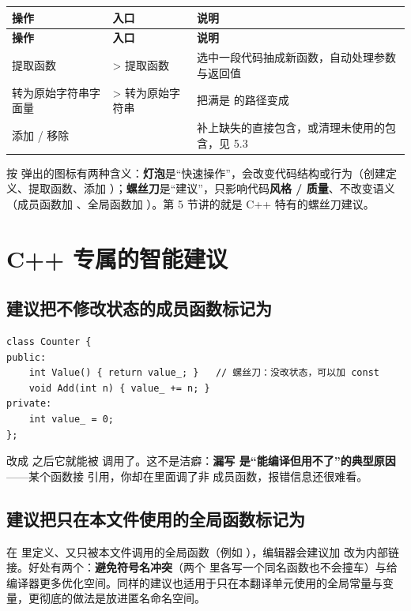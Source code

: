 \begin{longtable}{L{3.4cm}L{4.4cm}L{6.8cm}}\toprule
\textbf{操作} & \textbf{入口} & \textbf{说明} \\ \midrule \endfirsthead
\toprule \textbf{操作} & \textbf{入口} & \textbf{说明} \\ \midrule \endhead \bottomrule \endlastfoot
提取函数 &  > 提取函数 & 选中一段代码抽成新函数，自动处理参数与返回值 \\
转为原始字符串字面量 &  > 转为原始字符串 & 把满是 \codeP{\textbackslash{}\textbackslash{}} 的路径变成  \\
添加 / 移除  &  & 补上缺失的直接包含，或清理未使用的包含，见 5.3 \\
\end{longtable}
按  弹出的图标有两种含义：\textbf{灯泡}是“快速操作”，会改变代码结构或行为（创建定义、提取函数、添加 ）；\textbf{螺丝刀}是“建议”，只影响代码\textbf{风格 / 质量}、不改变语义（成员函数加 、全局函数加 ）。第 5 节讲的就是 C++ 特有的螺丝刀建议。

\section{C++ 专属的智能建议}
\subsection{建议把不修改状态的成员函数标记为 }

\begin{lstlisting}[style=cppstyle]
class Counter {
public:
    int Value() { return value_; }   // 螺丝刀：没改状态，可以加 const
    void Add(int n) { value_ += n; }
private:
    int value_ = 0;
};
\end{lstlisting}
改成  之后它就能被  调用了。这不是洁癖：\textbf{漏写  是“能编译但用不了”的典型原因}——某个函数接  引用，你却在里面调了非  成员函数，报错信息还很难看。

\subsection{建议把只在本文件使用的全局函数标记为 }

在  里定义、又只被本文件调用的全局函数（例如 ），编辑器会建议加  改为内部链接。好处有两个：\textbf{避免符号名冲突}（两个  里各写一个同名函数也不会撞车）与给编译器更多优化空间。同样的建议也适用于只在本翻译单元使用的全局常量与变量，更彻底的做法是放进匿名命名空间。

